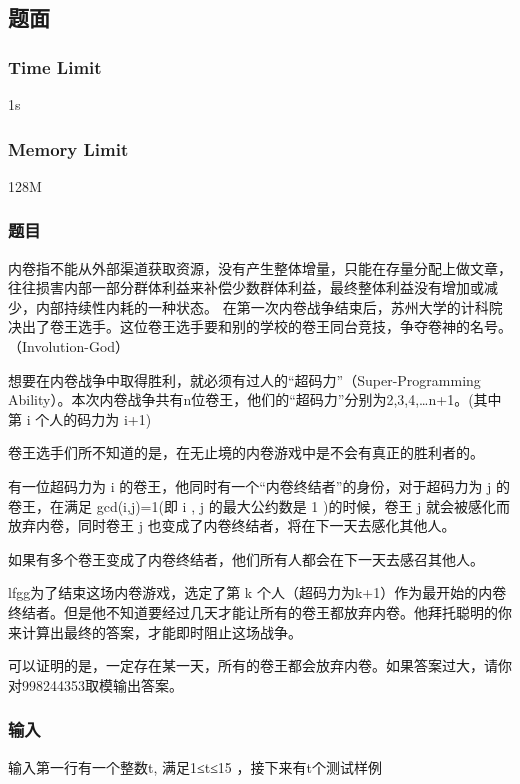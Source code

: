 \subsection{题面}

\subsubsection{Time Limit}
1s

\subsubsection{Memory Limit}
128M

\subsubsection{题目}
内卷指不能从外部渠道获取资源，没有产生整体增量，只能在存量分配上做文章，往往损害内部一部分群体利益来补偿少数群体利益，最终整体利益没有增加或减少，内部持续性内耗的一种状态。
在第一次内卷战争结束后，苏州大学的计科院决出了卷王选手。这位卷王选手要和别的学校的卷王同台竞技，争夺卷神的名号。（Involution-God）

想要在内卷战争中取得胜利，就必须有过人的“超码力”（Super-Programming Ability）。本次内卷战争共有n位卷王，他们的“超码力”分别为2,3,4,…n+1。(其中第 i 个人的码力为 i+1)

卷王选手们所不知道的是，在无止境的内卷游戏中是不会有真正的胜利者的。

有一位超码力为 i 的卷王，他同时有一个“内卷终结者”的身份，对于超码力为 j 的卷王，在满足 gcd(i,j)=1(即 i , j 的最大公约数是 1 )的时候，卷王 j 就会被感化而放弃内卷，同时卷王 j 也变成了内卷终结者，将在下一天去感化其他人。

如果有多个卷王变成了内卷终结者，他们所有人都会在下一天去感召其他人。

lfgg为了结束这场内卷游戏，选定了第 k 个人（超码力为k+1）作为最开始的内卷终结者。但是他不知道要经过几天才能让所有的卷王都放弃内卷。他拜托聪明的你来计算出最终的答案，才能即时阻止这场战争。

可以证明的是，一定存在某一天，所有的卷王都会放弃内卷。如果答案过大，请你对998244353取模输出答案。

\subsubsection{输入}
输入第一行有一个整数t, 满足1≤t≤15 ，接下来有t个测试样例

